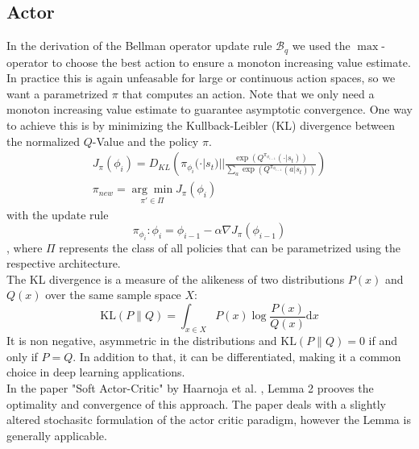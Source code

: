 \subsection{Actor}
In the derivation of the Bellman operator update rule $\mathcal{B}_q$ we used the $\max$-operator to choose the best action to ensure a monoton increasing value estimate. In practice this is again unfeasable 
for large or continuous action spaces, so we want a parametrized $\pi$ that computes an action. Note that we only need a monoton increasing value estimate to guarantee asymptotic convergence. One way to 
achieve this is by minimizing the Kullback-Leibler (KL) divergence between the normalized $Q$-Value and the policy $\pi$. 
\begin{equation}
    \label{kl-obj}
    \begin{aligned}
        J_\pi(\phi_{i}) = D_{KL} \left( \pi_{\phi_{i}}(\cdot|s_t) || \frac{\exp(Q^{\pi_{\phi_{i-1}}}(\cdot|s_t))}{\underset{a}{\sum}  \exp(Q^{\pi_{\phi_{i-1}}}(a|s_t))} \right) \\
        \pi_{new} = \underset{\pi' \in \Pi}{\arg\min} J_\pi(\phi_{i})
    \end{aligned}
\end{equation}
with the update rule
\begin{equation}
    \pi_{\phi_{i}} : \phi_{i} = \phi_{i-1} - \alpha \nabla J_\pi(\phi_{i-1})
\end{equation}
, where $\Pi$ represents the class of all policies that can be parametrized using the respective architecture. \\
The KL divergence is a measure of the alikeness of two distributions $P(x)$ and $Q(x)$ over the same sample space $X$:
\begin{equation}
    \label{KL}
    \mathrm{KL}(P\|Q) = \int_{x\in X} P(x) \log \frac{P(x)}{Q(x)} \mathrm{d}x
\end{equation}
It is non negative, asymmetric in the distributions and $\mathrm{KL}(P\|Q) = 0$ if and only if $P = Q$. In addition to that, it can be differentiated, making it 
a common choice in deep learning applications.\\

In the paper "Soft Actor-Critic" by Haarnoja et al. \cite{haarnoja2018soft}, 
Lemma 2 prooves the optimality and convergence of this approach. The paper deals with a slightly altered stochasitc formulation of the actor critic paradigm, however the Lemma is generally applicable.

